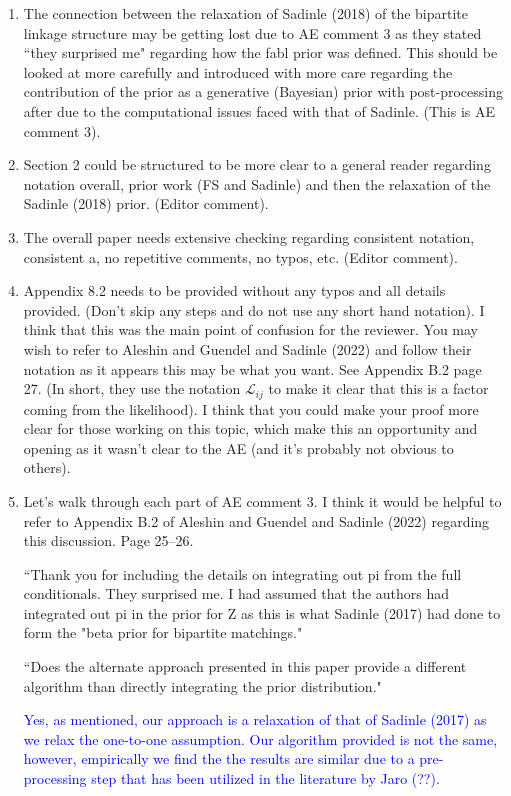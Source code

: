 \documentclass{article}
\begin{document}
\begin{enumerate}
\item The connection between the relaxation of Sadinle (2018) of the bipartite linkage structure may be getting lost due to AE comment 3 as they stated ``they surprised me" regarding how the fabl prior was defined. This should be looked at more carefully and introduced with more care regarding the contribution of the prior as a generative (Bayesian) prior with post-processing after due to the computational issues faced with that of Sadinle. (This is AE comment 3). 
\item Section 2 could be structured to be more clear to a general reader regarding notation overall, prior work (FS and Sadinle) and then the relaxation of the Sadinle (2018) prior. (Editor comment). 
\item The overall paper needs extensive checking regarding consistent notation, consistent a, no repetitive comments, no typos, etc. (Editor comment). 
\item Appendix 8.2 needs to be provided without any typos and all details provided. (Don't skip any steps and do not use any short hand notation). I think that this was the main point of confusion for the reviewer. You may wish to refer to Aleshin and Guendel and Sadinle (2022) and follow their notation as it appears this may be what you want. See Appendix B.2 page 27. (In short, they use the notation $\mathcal{L}_{ij}$ to make it clear that this is a factor coming from the likelihood). I think that you could make your proof more clear for those working on this topic, which make this an opportunity and opening as it wasn't clear to the AE (and it's probably not obvious to others).
\item Let's walk through each part of AE comment 3. I think it would be helpful to refer to Appendix B.2 of Aleshin and Guendel and Sadinle (2022) regarding this discussion. Page 25--26.

``Thank you for including the details on integrating out pi from the full conditionals. They surprised me. I had assumed that the authors had integrated out pi in the prior for Z as this is what Sadinle (2017) had done to form the "beta prior for bipartite matchings." 

``Does the alternate approach presented in this paper provide a different algorithm than directly integrating the prior distribution."

\textcolor{blue}{Yes, as mentioned, our approach is a relaxation of that of Sadinle (2017) as we relax the one-to-one assumption. Our algorithm provided is not the same, however, empirically we find the the results are similar due to a pre-processing step that has been utilized in the literature by Jaro (??).}


\end{enumerate}
\end{document}
